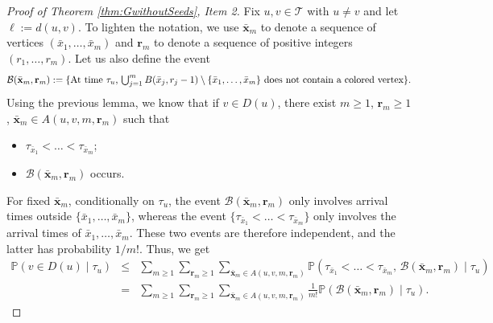 \documentclass[french]{article}
\renewcommand{\P}{\mathbb{P}}
\newcommand{\T}{\mathcal{T}}
\renewcommand{\1}{\mathds{1}}
\begin{document}
\begin{proof}[Proof of Theorem \ref{thm:GwithoutSeeds}, Item 2]
Fix $u,v\in \T$ with $u\neq v$ and let $\ell:=d(u,v)$. To lighten the notation, we use $\bar{\mathbf{x}}_m$ to denote a sequence of vertices $(\bar{x}_1,\ldots,\bar{x}_m)$ and $\mathbf{r}_m$ to denote a sequence of positive integers $(r_1,\ldots,r_m)$. Let us also define the event
$$\mathcal{B}(\bar{\mathbf{x}}_m,\mathbf{r}_m):=\{\hbox{At time $\tau_u$, $\bigcup_{j=1}^m B(\bar{x}_{j},r_j-1)\setminus\{\bar{x}_1,\ldots,\bar{x}_m\}$ does not contain a colored vertex}\}.$$
Using the previous lemma, we know that if $v\in D(u)$, there exist $m\ge 1$, $\mathbf{r}_m\ge 1$, $\bar{\mathbf{x}}_{m}\in A(u,v,m,\mathbf{r}_m)$ such that 
\begin{itemize}
    \item $\tau_{\bar{x}_1}<\ldots<\tau_{\bar{x}_m}$;
    \item $\mathcal{B}(\bar{\mathbf{x}}_m,\mathbf{r}_m)$ occurs.
\end{itemize}
For fixed $\bar{\mathbf{x}}_m$, conditionally on $\tau_u$, the event $\mathcal{B}(\bar{\mathbf{x}}_m,\mathbf{r}_m)$ only involves arrival times outside $\{\bar{x}_1,\ldots,\bar{x}_m\}$, whereas the event $\{\tau_{\bar{x}_1}<\ldots<\tau_{\bar{x}_m}\}$ only involves the arrival times of $\bar{x}_1,\ldots,\bar{x}_m$. These two events are therefore independent, and the latter has probability $1/m!$. Thus, we get 
\begin{eqnarray}    \P(v\in D(u)\mid \tau_u) & \le & \sum_{m\ge 1} \sum_{\mathbf{r}_m\ge 1}  \sum_{\bar{\mathbf{x}}_m\in A(u,v,m,\mathbf{r}_m)}\P(\tau_{\bar{x}_1}<\ldots<\tau_{\bar{x}_m},\, \mathcal{B}(\bar{\mathbf{x}}_m,\mathbf{r}_m) \mid \tau_u) \nonumber \\
& = & \sum_{m\ge 1} \sum_{\mathbf{r}_m\ge 1}  \sum_{\bar{\mathbf{x}}_m\in A(u,v,m,\mathbf{r}_m)} \frac{1}{m!}\P(\mathcal{B}(\bar{\mathbf{x}}_m,\mathbf{r}_m) \mid \tau_u). \label{eq:descendance1}
\end{eqnarray}


\end{proof}
\end{document}
